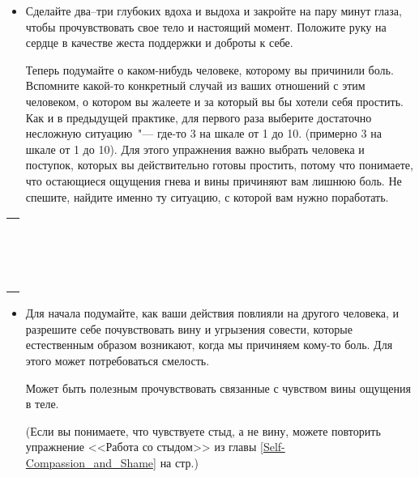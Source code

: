\begin{itemize}
	\item Сделайте два--три глубоких вдоха и выдоха и закройте на пару минут глаза, чтобы прочувствовать свое тело и настоящий момент. Положите руку на сердце в качестве жеста поддержки и доброты к себе.
	
	\itemWritingHand Теперь подумайте о каком-нибудь человеке, которому вы причинили боль. Вспомните какой-то конкретный случай из ваших отношений с этим человеком, о котором вы жалеете и за который вы бы хотели себя простить. Как и в предыдущей практике, для первого раза выберите достаточно несложную ситуацию~"--- где-то 3 на шкале от 1 до 10.  (примерно 3 на шкале от 1 до 10). Для этого упражнения важно выбрать человека и поступок, которых вы действительно готовы простить, потому что понимаете, что остающиеся ощущения гнева и вины причиняют вам лишнюю боль. Не спешите, найдите именно ту ситуацию, с которой вам нужно поработать.	
\end{itemize}
\setlength{\extrarowheight}{2mm}
\begin{tabularx}{\textwidth}{X}
	\\
	\arrayrulecolor{gray}\hline\\
	\hline\\
	\hline\\
	\hline\\
	\hline\\
	\hline\\	
	\hline\\
	\hline\\
	\hline\\
	\hline\\
	\hline\\
	\hline\\
	\hline\\
	\hline\\
	\hline\\
	\hline\\
\end{tabularx}
\setlength{\extrarowheight}{0mm}



\begin{itemize}
	\item Для начала подумайте, как ваши действия повлияли на другого человека, и разрешите себе почувствовать вину и угрызения совести, которые естественным образом возникают, когда мы причиняем кому-то боль. Для этого может потребоваться смелость. 

	Может быть полезным прочувствовать связанные с чувством вины ощущения в теле.
	
	(Если вы понимаете, что чувствуете стыд, а не вину, можете повторить упражнение <<Работа со стыдом>> из главы \ref{Self-Compassion_and_Shame} на стр.\:\pageref{IP:Working_with_Shame})
\end{itemize}

